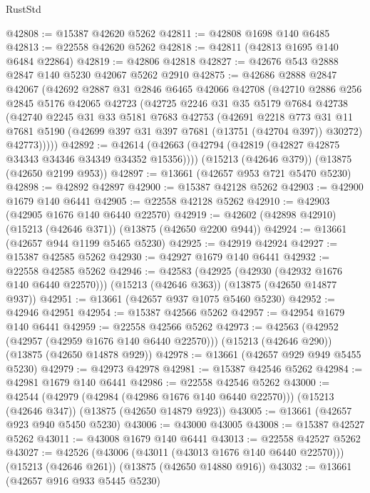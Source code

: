 \begin{lexlean}{RustStd}
\begin{coremodule}
@42808 := @15387 @42620 @5262
@42811 := @42808 @1698 @140 @6485
@42813 := @22558 @42620 @5262
@42818 := @42811 (@42813 @1695 @140 @6484 @22864)
@42819 := @42806 @42818
@42827 := @42676 @543 @2888 @2847 @140 @5230 @42067 @5262 @2910
@42875 := @42686
    @2888
    @2847
    @42067
    (@42692
      @2887
      @31
      @2846
      @6465
      @42066
      @42708
      (@42710
        @2886
        @256
        @2845
        @5176
        @42065
        @42723
        (@42725
          @2246
          @31
          @35
          @5179
          @7684
          @42738
          (@42740
            @2245
            @31
            @33
            @5181
            @7683
            @42753
            (@42691
              @2218
              @773
              @31
              @11
              @7681
              @5190
              (@42699 @397 @31 @397 @7681 (@13751 (@42704 @397)) @30272)
              @42773)))))
@42892 := @42614
    (@42663 (@42794 (@42819 (@42827 @42875 @34343 @34346 @34349 @34352 @15356))))
    (@15213 (@42646 @379))
    (@13875 (@42650 @2199 @953))
@42897 := @13661 (@42657 @953 @721 @5470 @5230)
@42898 := @42892 @42897
@42900 := @15387 @42128 @5262
@42903 := @42900 @1679 @140 @6441
@42905 := @22558 @42128 @5262
@42910 := @42903 (@42905 @1676 @140 @6440 @22570)
@42919 := @42602 (@42898 @42910) (@15213 (@42646 @371)) (@13875 (@42650 @2200 @944))
@42924 := @13661 (@42657 @944 @1199 @5465 @5230)
@42925 := @42919 @42924
@42927 := @15387 @42585 @5262
@42930 := @42927 @1679 @140 @6441
@42932 := @22558 @42585 @5262
@42946 := @42583
    (@42925 (@42930 (@42932 @1676 @140 @6440 @22570)))
    (@15213 (@42646 @363))
    (@13875 (@42650 @14877 @937))
@42951 := @13661 (@42657 @937 @1075 @5460 @5230)
@42952 := @42946 @42951
@42954 := @15387 @42566 @5262
@42957 := @42954 @1679 @140 @6441
@42959 := @22558 @42566 @5262
@42973 := @42563
    (@42952 (@42957 (@42959 @1676 @140 @6440 @22570)))
    (@15213 (@42646 @290))
    (@13875 (@42650 @14878 @929))
@42978 := @13661 (@42657 @929 @949 @5455 @5230)
@42979 := @42973 @42978
@42981 := @15387 @42546 @5262
@42984 := @42981 @1679 @140 @6441
@42986 := @22558 @42546 @5262
@43000 := @42544
    (@42979 (@42984 (@42986 @1676 @140 @6440 @22570)))
    (@15213 (@42646 @347))
    (@13875 (@42650 @14879 @923))
@43005 := @13661 (@42657 @923 @940 @5450 @5230)
@43006 := @43000 @43005
@43008 := @15387 @42527 @5262
@43011 := @43008 @1679 @140 @6441
@43013 := @22558 @42527 @5262
@43027 := @42526
    (@43006 (@43011 (@43013 @1676 @140 @6440 @22570)))
    (@15213 (@42646 @261))
    (@13875 (@42650 @14880 @916))
@43032 := @13661 (@42657 @916 @933 @5445 @5230)

\end{coremodule}
\end{lexlean}
